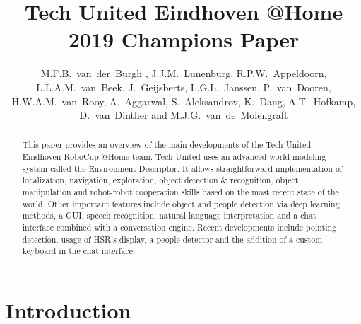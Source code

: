 \documentclass[runningheads,a4paper]{llncs}
\begin{document}

\title{Tech United Eindhoven @Home \\2019 Champions Paper}


\author{M.F.B.~van~der~Burgh , J.J.M.~Lunenburg,  R.P.W.~Appeldoorn, L.L.A.M.~van~Beek,
J.~Geijsberts, L.G.L.~Janssen, P.~van~Dooren, 
H.W.A.M.~van~Rooy, A.~Aggarwal, S.~Aleksandrov, K.~Dang, A.T.~Hofkamp, D.~van~Dinther and M.J.G.~van~de~Molengraft}




\maketitle
%
%
%
\begin{abstract}
This paper provides an overview of the main developments of the Tech United Eindhoven RoboCup @Home team. Tech United uses an advanced world modeling system called the Environment Descriptor. It allows straightforward implementation of localization, navigation, exploration, object detection \& recognition, object manipulation and robot-robot cooperation skills based on the most recent state of the world. Other important features include object and people detection via deep learning methods, a GUI, speech recognition, natural language interpretation and a chat interface combined with a conversation engine. Recent developments include pointing detection, usage of HSR's display, a people detector and the addition of a custom keyboard in the chat interface.

\end{abstract}
%
%
%

\section{Introduction}

\end{document}
